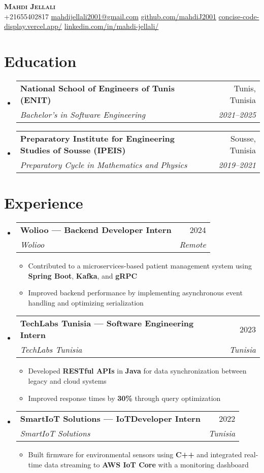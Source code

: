 \documentclass[letterpaper,11pt]{article}
\makeatletter
\newcommand{\resumeItem}[1]{
    \item\small{
            {#1 \vspace{-2pt}}
    }
}
\newcommand{\resumeSubheading}[4]{
    \vspace{-2pt}\item
    \begin{tabular*}{0.97\textwidth}[t]{l@{\extracolsep{\fill}}r}
    \textbf{#1} & #2 \\
    \textit{\small#3} & \textit{\small #4} \\
    \end{tabular*}\vspace{-7pt}
}
\newcommand{\resumeSubHeadingListStart}{\begin{itemize}[leftmargin=0.15in, label={}]}
\newcommand{\resumeSubHeadingListEnd}{\end{itemize}}
\newcommand{\resumeItemListStart}{\begin{itemize}}
\newcommand{\resumeItemListEnd}{\end{itemize}\vspace{-5pt}}
\makeatother
\begin{document}
\begin{center}
\textbf{\Huge \scshape Mahdi Jellali} \\ \vspace{1pt}
\small
+21655402817 \quad
\href{mailto:mahdijellali2001@gmail.com}{mahdijellali2001@gmail.com} \quad
\href{https://github.com/mahdiJ2001}{github.com/mahdiJ2001} \quad
\href{https://concise-code-display.vercel.app/}{concise-code-display.vercel.app/} \quad
\href{https://www.linkedin.com/in/mahdi-jellali/}{linkedin.com/in/mahdi-jellali/}
\end{center}

\vspace{10pt}
\section{Education}
\resumeSubHeadingListStart
\resumeSubheading
{National School of Engineers of Tunis (ENIT)}{Tunis, Tunisia}
{Bachelor’s in Software Engineering}{2021--2025}
\resumeSubheading
{Preparatory Institute for Engineering Studies of Sousse (IPEIS)}{Sousse, Tunisia}
{Preparatory Cycle in Mathematics and Physics}{2019--2021}
\resumeSubHeadingListEnd

\section{Experience}
\resumeSubHeadingListStart
\resumeSubheading
{Wolioo — Backend Developer Intern}{2024}
{Wolioo}{Remote}
\resumeItemListStart
\resumeItem{Contributed to a microservices-based patient management system using \textbf{Spring Boot}, \textbf{Kafka}, and \textbf{gRPC}}
\resumeItem{Improved backend performance by implementing asynchronous event handling and optimizing serialization}
\resumeItemListEnd
\resumeSubheading
{TechLabs Tunisia — Software Engineering Intern}{2023}
{TechLabs Tunisia}{Tunisia}
\resumeItemListStart
\resumeItem{Developed \textbf{RESTful APIs} in \textbf{Java} for data synchronization between legacy and cloud systems}
\resumeItem{Improved response times by \textbf{30\%} through query optimization}
\resumeItemListEnd
\resumeSubheading
{SmartIoT Solutions — IoTDeveloper Intern}{2022}
{SmartIoT Solutions}{Tunisia}
\resumeItemListStart
\resumeItem{Built firmware for environmental sensors using \textbf{C++} and integrated real-time data streaming to \textbf{AWS IoT Core} with a monitoring dashboard}
\resumeItemListEnd
\resumeSubHeadingListEnd
\end{document}
